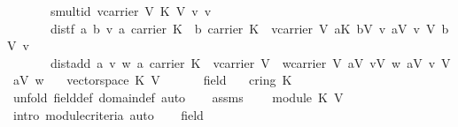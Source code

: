 \begin{isabellebody}
\ \ \ \ \ \ \ smult{\isacharunderscore}id{\isacharcolon}\ {\isachardoublequoteopen}{\isasymforall}v{\isasymin}carrier\ V{\isachardot}\ {\isacharparenleft}{\isasymone}\isactrlbsub K\isactrlesub \ {\isasymodot}\isactrlbsub V\isactrlesub \ v\ {\isacharequal}v{\isacharparenright}{\isachardoublequoteclose}\isanewline
\ \ \ \ \ \ \ dist{\isacharunderscore}f{\isacharcolon}\ {\isachardoublequoteopen}{\isasymforall}a\ b\ v{\isachardot}\ a{\isasymin}\ carrier\ K\ {\isasymand}\ b{\isasymin}\ carrier\ K\ {\isasymand}\ v{\isasymin}carrier\ V{\isasymlongrightarrow}\ {\isacharparenleft}a{\isasymoplus}\isactrlbsub K\isactrlesub \ b{\isacharparenright}{\isasymodot}\isactrlbsub V\isactrlesub \ v\ {\isacharequal}{\isacharparenleft}a{\isasymodot}\isactrlbsub V\isactrlesub \ v{\isacharparenright}\ {\isasymoplus}\isactrlbsub V\isactrlesub \ {\isacharparenleft}b{\isasymodot}\isactrlbsub V\isactrlesub \ v{\isacharparenright}{\isachardoublequoteclose}\isanewline
\ \ \ \ \ \ \ dist{\isacharunderscore}add{\isacharcolon}\ {\isachardoublequoteopen}{\isasymforall}a\ v\ w{\isachardot}\ a{\isasymin}\ carrier\ K\ {\isasymand}\ v{\isasymin}carrier\ V\ {\isasymand}\ w{\isasymin}carrier\ V{\isasymlongrightarrow}\ a{\isasymodot}\isactrlbsub V\isactrlesub \ {\isacharparenleft}v{\isasymoplus}\isactrlbsub V\isactrlesub \ w{\isacharparenright}\ {\isacharequal}{\isacharparenleft}a{\isasymodot}\isactrlbsub V\isactrlesub \ v{\isacharparenright}\ {\isasymoplus}\isactrlbsub V\isactrlesub \ {\isacharparenleft}a{\isasymodot}\isactrlbsub V\isactrlesub \ w{\isacharparenright}{\isachardoublequoteclose}\isanewline
\ \ \ {\isachardoublequoteopen}vectorspace\ K\ V{\isachardoublequoteclose}\isanewline
%
\isadelimproof
%
\endisadelimproof
%
\isatagproof
{}\isamarkupfalse%
\ {\isacharminus}\ \isanewline
\ \ \isamarkupfalse%
\ field\ \isamarkupfalse%
\ {}{\isacharcolon}\ {\isachardoublequoteopen}cring\ K{\isachardoublequoteclose}\ \isamarkupfalse%
\ {\isacharparenleft}unfold\ field{\isacharunderscore}def\ domain{\isacharunderscore}def{\isacharcomma}\ auto{\isacharparenright}\isanewline
\ \ \isamarkupfalse%
\ assms\ {}\ \isamarkupfalse%
\ {}{\isacharcolon}\ {\isachardoublequoteopen}module\ K\ V{\isachardoublequoteclose}\ \isamarkupfalse%
\ {\isacharparenleft}intro\ module{\isacharunderscore}criteria{\isacharcomma}\ auto{\isacharparenright}\isanewline
\ \ \isamarkupfalse%
\ field\ {}\ \isamarkupfalse%

\end{isabellebody}
